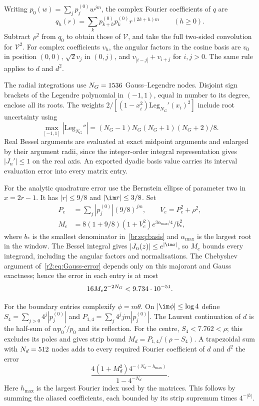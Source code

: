 Writing $p_0(w)=\sum_jp_j^{(0)}w^{jm}$, the complex Fourier coefficients
of $q$ are
\[
 q_h(r)=\sum_kp_{k+h}^{(0)}p_k^{(0)}r^{(2k+h)m}\qquad(h\ge0).
\]
Subtract $\rho^2$ from $q_0$ to obtain those of $\mathcal V$, and take
the full two-sided convolution for $\mathcal V^2$. For complex coefficients
$v_h$, the angular factors in the cosine basis are $v_0$ in position
$(0,0)$, $\sqrt2v_j$ in $(0,j)$, and $v_{|i-j|}+v_{i+j}$ for $i,j>0$.
The same rule applies to $d$ and $d^2$.

The radial integrations use $N_G=1536$ Gauss--Legendre nodes.
Disjoint sign brackets of the Legendre polynomial in $(-1,1)$, equal in
number to its degree, enclose all its roots. The weights
$2/[(1-x_i^2)\mathrm{Leg}_{N_G}'(x_i)^2]$ include root uncertainty using
\[
 \max_{[-1,1]}|\mathrm{Leg}_{N_G}''|
 = (N_G-1)N_G(N_G+1)(N_G+2)/8.
\]
Real Bessel arguments are evaluated at exact midpoint arguments and
enlarged by their argument radii, since the integer-order integral
representation gives $|J_n'|\le1$ on the real axis. An exported dyadic
basis value carries its interval evaluation error into every matrix entry.

For the analytic quadrature error use the Bernstein ellipse of parameter
two in $x=2r-1$. It has $|r|\le9/8$ and $|\im r|\le3/8$. Set
\begin{equation}\label{br:eq:Gauss-majorant}
 \begin{split}
 P_e&=\sum_j|p_j^{(0)}|(9/8)^{jm},\qquad V_e=P_e^2+\rho^2,\\
 M_e&=8(1+9/8)(1+V_e^2)e^{3\alpha_{\max}/4}/b_*^2,
 \end{split}
\end{equation}
where $b_*$ is the smallest denominator in~\eqref{br:eq:basis} and
$\alpha_{\max}$ is the largest root in the window. The Bessel integral
gives $|J_n(z)|\le e^{|\im z|}$, so $M_e$ bounds every integrand, including
the angular factors and normalisations. The Chebyshev argument
of~\eqref{r2:eq:Gauss-error} depends only on this majorant and Gauss
exactness; hence the error in each entry is at most
\begin{equation}\label{br:eq:Gauss-error}
 16M_e2^{-2N_G}<9.734\cdot10^{-51}.
\end{equation}

For the boundary entries complexify $\phi=m\theta$. On
$|\im\phi|\le\log4$ define
$S_4=\sum_{j>0}4^j|p_j^{(0)}|$ and
$P_{1,4}=\sum_j4^jjm|p_j^{(0)}|$.
The Laurent continuation of $d$ is the half-sum of $wp_0'/p_0$ and its
reflection. For the centre, $S_4<7.762<\rho$; this excludes its poles and gives strip
bound $M_d=P_{1,4}/(\rho-S_4)$. A trapezoidal sum with
$N_d=512$ nodes adds to every required Fourier coefficient of $d$
and $d^2$ the error
\begin{equation}\label{br:eq:boundary-matrix-error}
 \frac{4(1+M_d^2)4^{-(N_d-h_{\max})}}{1-4^{-N_d}}.
\end{equation}
Here $h_{\max}$ is the largest Fourier index used by the matrices.
This follows by summing the aliased coefficients, each bounded by its
strip supremum times $4^{-|h|}$.

